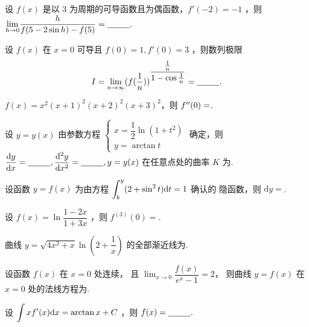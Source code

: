 \begin{quest}[660T29]
    设 $ f(x) $ 是以 $ 3 $ 为周期的可导函数且为偶函数，$ f'(-2) = -1 $ ，则
    $ {\displaystyle\lim_{h\rightarrow 0}}\dfrac{h}{f(5-2\sin h) - f(5)} = \underline{~~~~~~~~}. $ 
\end{quest}

\begin{quest}[660T30]
    设 $ f(x) $ 在 $ x= 0 $ 可导且 $ f(0) = 1,f'(0)=3 $ ，则数列极限
    $$
    \displaystyle I = {\displaystyle\lim_{n\rightarrow \infty}}
    (f(\dfrac{1}{n}))^{\dfrac{\frac{1}{n}}{1-\cos\frac{1}{n}}} =\underline{~~~~~~~~}.
    $$
\end{quest}

\begin{quest}[660T33]
    $ f(x) = x^2(x+1)^2(x+2)^2(x+3)^2 $，则 $ f^{\prime\prime}(0) =$\qline. 
\end{quest}

\begin{quest}[660T34]
    设 $ y = y(x) $ 由参数方程 
    $ \begin{cases}
        x = \dfrac{1}{2}\ln (1+t^2)\\ y = \arctan t
    \end{cases} $ 确定，则 $ \dfrac{\mathrm{d}y}{\mathrm{d}x} = \underline{~~~~~~~~},
    \dfrac{\mathrm{d}^2y}{\mathrm{d}x^2}=\underline{~~~~~~~~},y = y(x) $ 在任意点处的曲率 $ K $ 为\qline.
\end{quest}

\begin{quest}[660T38]
    设函数 $ y=f(x) $ 为由方程 $ \displaystyle \int_b^y(2+\sin^2t)\mathrm{d}t = 1 $ 确认的
    隐函数，则 $ \mathrm{d}y =$\qline.
\end{quest}

\begin{quest}[660T40]
    设 $ f(x) =\ln \dfrac{1-2x}{1+3x} $ ，则 $ f^{(3)}(0) = $\qline. 
\end{quest}

\begin{quest}[660T48]
    曲线 $ y = \sqrt{4x^2+x}\ln (2+\dfrac{1}{x}) $ 的全部渐近线为\qline.
\end{quest}

\begin{quest}[660T49]
    设函数 $ f(x) $ 在 $ x = 0 $ 处连续，
    且 $ {\displaystyle\lim_{x\rightarrow 0}}\dfrac{f(x)}{e^x - 1} = 2 $，
    则曲线 $ y = f(x) $ 在 $ x = 0 $ 处的法线方程为\qline.
\end{quest}

\begin{quest}[660T51]
    设 $ \displaystyle \int xf'(x)\mathrm{d}x = \arctan x + C $ ，则 $ f(x) = \underline{~~~~~~~~}. $ 
\end{quest}

